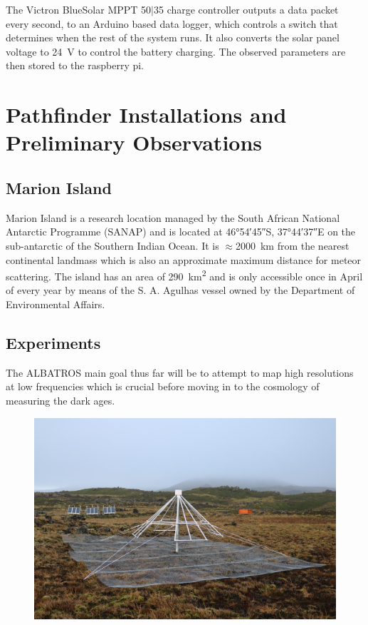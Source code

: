 \documentclass{ws-jai}
\begin{document}
The Victron BlueSolar MPPT 50$\vert$35 charge controller outputs a data packet every second, to an Arduino based data logger, which controls a switch that determines when the rest of the system runs. It also converts the solar panel voltage to \SI{24}{\volt} to control the battery charging. The observed parameters are then stored to the raspberry pi.

\section{Pathfinder Installations and Preliminary Observations}
\subsection{Marion Island}
 Marion Island is a research location managed by the South African National Antarctic Programme (SANAP) and is located at \ang{46;54;45}S, \ang{37;44;37}E on the sub-antarctic of the Southern Indian Ocean. It is $\approx$\SI{2000}{\kilo\metre} from the nearest continental landmass which is also an approximate maximum distance for meteor scattering. The island has an area of \SI{290}{\kilo\metre\squared} and is only accessible once in April of every year by means of the S. A. Agulhas vessel owned by the Department of Environmental Affairs.  
 
 \subsection{Experiments}
 
 The ALBATROS main goal thus far will be to attempt to map high resolutions at low frequencies which is crucial before moving in to the cosmology of measuring the dark ages.
 
 
 
 
	\begin{figure}[h]
		\begin{center}
			\includegraphics[width=1\linewidth]{Figures/autonomous.jpg}
			\caption{}
			\label{Fig:autonomous}
		\end{center}
	\end{figure}
		
\end{document}
